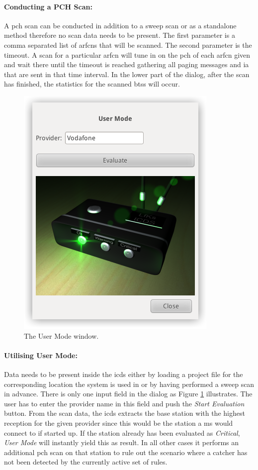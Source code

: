 \paragraph{Conducting a PCH Scan:} A \gls{pch} scan can be conducted in addition to a sweep scan or as a standalone method therefore no scan data needs to be present.
The first parameter is a comma separated list of \glspl{arfcn} that will be scanned.
The second parameter is the timeout. 
A scan for a particular \gls{arfcn} will tune in on the \gls{pch} of each \gls{arfcn} given and wait there until the timeout is reached gathering all paging messages and \gls{ia} that are sent in that time interval.
In the lower part of the dialog, after the scan has finished, the statistics for the scanned \glspl{bts} will occur.

\begin{figure}
\centering
\includegraphics[width=.4\textwidth]{../Images/user_window}
\caption{The User Mode window.}
\label{fig:user_mode}
\end{figure}

\paragraph{Utilising User Mode:} Data needs to be present inside the \gls{icds} either by loading a project file for the corresponding location the system is used in or by having performed a sweep scan in advance.
There is only one input field in the dialog as Figure \ref{fig:user_mode} illustrates.
The user has to enter the provider name in this field and push the \emph{Start Evaluation} button.
From the scan data, the \gls{icds} extracts the base station with the highest reception for the given provider since this would be the station a \gls{ms} would connect to if started up.
If the station already has been evaluated as \emph{Critical}, \emph{User Mode} will instantly yield this as result.
In all other cases it performs an additional \gls{pch} scan on that station to rule out the scenario where a catcher has not been detected by the currently active set of rules.

